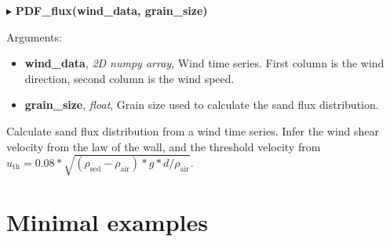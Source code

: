 \documentclass[12pt]{article}
\newenvironment{myenv}{\begin{adjustwidth}{2cm}{}}{\end{adjustwidth}}
\newcommand{\Function}[3]{\filbreak\noindent
$\blacktriangleright$ \quad\textbf{#1}
\begin{myenv}

Arguments: {#2}

{#3}
\end{myenv}
\vspace*{0.4 cm}}
\newcommand{\Argument}[3]{\noindent 
\textbf{#1}, \textit{#2}, {#3}}
\begin{document}
\Function{PDF\_flux(wind\_data, grain\_size)}{
\begin{itemize}
	\item \Argument{wind\_data}{2D numpy array}{Wind time series. First column is the wind direction, second column is the wind speed.}
	\item \Argument{grain\_size}{float}{Grain size used to calculate the sand flux distribution.}
\end{itemize}
}{Calculate sand flux distribution from a wind time series. Infer the wind shear velocity from the law of the wall, and the threshold velocity from $u_{\textrm{th}} = 0.08 * \sqrt{(\rho_\textrm{sed}-\rho_\textrm{air})*g*d/\rho_\textrm{air}}$.}


\section{Minimal examples}
\inputminted{python}{example1.py}
\end{document}
